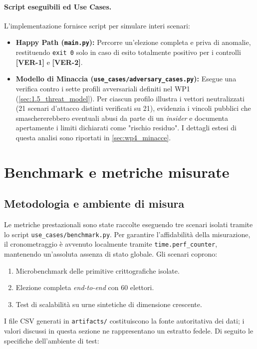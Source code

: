 \paragraph{Script eseguibili ed Use Cases.}
L'implementazione fornisce script per simulare interi scenari:
\begin{itemize}
  \item \textbf{Happy Path (\texttt{main.py}):} Percorre un'elezione completa e priva di anomalie, restituendo \texttt{exit 0} solo in caso di esito totalmente positivo per i controlli \textbf{[VER-1]} e \textbf{[VER-2]}.
  \item \textbf{Modello di Minaccia (\texttt{use\_cases/adversary\_cases.py}):} Esegue una verifica contro i sette profili avversariali definiti nel WP1 (\ref{sec:1.5_threat_model}). Per ciascun profilo illustra i vettori neutralizzati (21 scenari d'attacco distinti verificati su 21), evidenzia i vincoli pubblici che smaschererebbero eventuali abusi da parte di un \emph{insider} e documenta apertamente i limiti dichiarati come "rischio residuo". I dettagli estesi di questa analisi sono riportati in \ref{sec:wp4_minacce}.
\end{itemize}


\section{Benchmark e metriche misurate}
\label{sec:wp4_benchmark}

\subsection{Metodologia e ambiente di misura}
\label{subsec:wp4_metodologia}


Le metriche prestazionali sono state raccolte eseguendo tre scenari isolati tramite lo script \texttt{use\_cases/benchmark.py}. Per garantire l'affidabilità della misurazione, il cronometraggio è avvenuto localmente tramite \texttt{time.perf\_counter}, mantenendo un'assoluta assenza di stato globale. Gli scenari coprono:
\begin{enumerate}
  \item Microbenchmark delle primitive crittografiche isolate.
  \item Elezione completa \emph{end-to-end} con 60 elettori.
  \item Test di scalabilità su urne sintetiche di dimensione crescente.
\end{enumerate}

I file CSV generati in \texttt{artifacts/} costituiscono la fonte autoritativa dei dati; i valori discussi in questa sezione ne rappresentano un estratto fedele. Di seguito le specifiche dell'ambiente di test:


